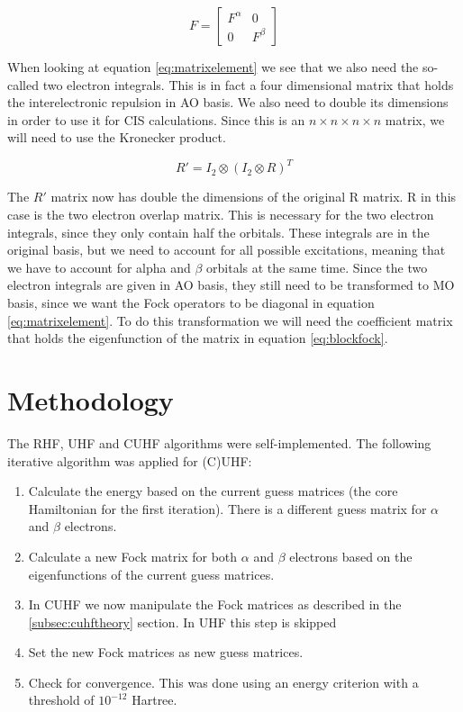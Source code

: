 \documentclass[twoside,twocolumn,9pt]{article}
\begin{document}
\begin{equation}\label{eq:blockfock}
  F = \begin{bmatrix}
    F^\alpha & 0       \\
    0        & F^\beta
  \end{bmatrix}
\end{equation}

When looking at equation \eqref{eq:matrixelement} we see that we also need the so-called two electron integrals. This is in fact a four dimensional matrix that holds the
interelectronic repulsion in AO basis. We also need to double its dimensions in order to use it for CIS calculations. Since this is an $n\times n\times n \times n$
matrix, we will need to use the Kronecker product.

\begin{equation}\label{eq:kron}
  R' = I_2 \otimes (I_2 \otimes R)^T
\end{equation}

The $R'$ matrix now has double the dimensions of the original R matrix. R in this case is the two electron overlap matrix. This is necessary for the two electron integrals, since
they only contain half the orbitals. These integrals are in the original basis, but we need to account for all possible excitations, meaning that we have to account for alpha and
$\beta$ orbitals at the same time. Since the two electron integrals are given in AO basis, they still need to be transformed to MO basis, since we want the Fock operators to be
diagonal in equation \eqref{eq:matrixelement}. To do this transformation we will need the coefficient matrix that holds the eigenfunction of the matrix in equation
\eqref{eq:blockfock}.

\section{Methodology}
\label{sec:method}
The RHF, UHF and CUHF algorithms were self-implemented. The following iterative algorithm was applied for (C)UHF:
\begin{enumerate}
  \item Calculate the energy based on the current guess matrices (the core Hamiltonian for the first iteration). There is a different guess matrix for $\alpha$ and $\beta$ electrons.
  \item Calculate a new Fock matrix for both $\alpha$ and $\beta$ electrons based on the eigenfunctions of the current guess matrices.
  \item In CUHF we now manipulate the Fock matrices as described in the \ref{subsec:cuhftheory} section. In UHF this step is skipped
  \item Set the new Fock matrices as new guess matrices.
  \item Check for convergence. This was done using an energy criterion with a threshold of $10^{-12}$ Hartree.
\end{enumerate}
\end{document}
